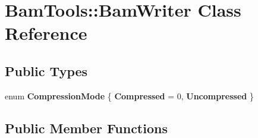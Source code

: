 \hypertarget{classBamTools_1_1BamWriter}{\section{Bam\-Tools\-:\-:Bam\-Writer Class Reference}
\label{classBamTools_1_1BamWriter}
}
\subsection*{Public Types}
\begin{DoxyCompactItemize}
\item 
enum {\bfseries Compression\-Mode} \{ {\bfseries Compressed} =  0, 
{\bfseries Uncompressed}
 \}
\end{DoxyCompactItemize}
\subsection*{Public Member Functions}
